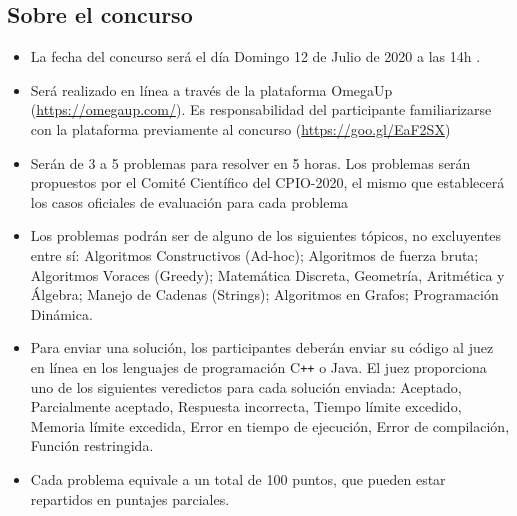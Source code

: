 \documentclass{article}
\begin{document}

\subsection{Sobre el concurso}

\begin{itemize}
    \item La fecha del concurso será el día {\color{red} Domingo 12 de Julio de 2020 a las 14h} . 

    
      \item Será realizado en línea a través de la plataforma OmegaUp (\url{https://omegaup.com/}).
    Es responsabilidad del participante familiarizarse con la plataforma previamente al concurso (\url{https://goo.gl/EaF2SX})
    
   \item Serán de 3 a 5 problemas para resolver en 5 horas.
   Los problemas serán propuestos por el Comité Científico del CPIO-2020, el mismo que establecerá los casos oficiales de evaluación para cada problema
   
    \item Los problemas podrán ser de alguno de los siguientes tópicos, no excluyentes entre sí:
Algoritmos Constructivos (Ad-hoc);
Algoritmos de fuerza bruta;
Algoritmos Voraces (Greedy);
Matemática Discreta,
Geometría, Aritmética y Álgebra;
Manejo de Cadenas (Strings);
Algoritmos en Grafos;
Programación Dinámica.

 \item 
 Para enviar una solución, los participantes deberán enviar su código al juez en línea en los lenguajes de programación C\texttt{++}  o Java.
El juez proporciona uno de los siguientes veredictos para cada solución enviada:
Aceptado,
Parcialmente aceptado,
Respuesta incorrecta,
Tiempo límite excedido,
Memoria límite excedida,
Error en tiempo de ejecución,
Error de compilación,
Función restringida.

\item

Cada problema equivale a un total de 100 puntos, que pueden estar repartidos en puntajes parciales.


\end{itemize}
\end{document}
